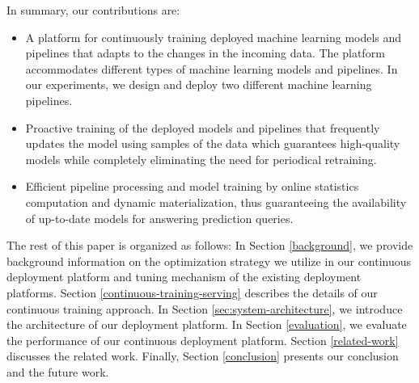 In summary, our contributions are:
\begin{itemize}
\item A platform for continuously training deployed machine learning models and pipelines that adapts to the changes in the incoming data. The platform accommodates different types of machine learning models and pipelines. In our experiments, we design and deploy two different machine learning pipelines.
\item Proactive training of the deployed models and pipelines that frequently updates the model using samples of the data which guarantees high-quality models while completely eliminating the need for periodical retraining.
\item Efficient pipeline processing and model training by online statistics computation and dynamic materialization, thus guaranteeing the availability of up-to-date models for answering prediction queries.
\end{itemize}

The rest of this paper is organized as follows:
In Section \ref{background}, we provide background information on the optimization strategy we utilize in our continuous deployment platform and tuning mechanism of the existing deployment platforms.
Section \ref{continuous-training-serving} describes the details of our continuous training approach.
In Section \ref{sec:system-architecture}, we introduce the architecture of our deployment platform.
In Section \ref{evaluation}, we evaluate the performance of our continuous deployment platform.
Section \ref {related-work} discusses the related work.
Finally, Section \ref{conclusion} presents our conclusion and the future work.